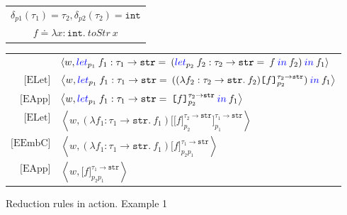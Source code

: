 \documentclass{article}
\newcommand{\emb}[3]{\texttt{[}#1\texttt{]}_{#2}^{#3}}
\newcommand{\tslam}[3]{\lambda #1 : #2. \: #3}
\newcommand{\plet}[5]{\textcolor[rgb]{0,0,1}{let}_{#1} \: {#2}:{#3} = \: #4 \: \textcolor[rgb]{0,0,1}{in} \: #5}
\newcommand{\eval}[2]{\left\langle {#1},{#2} \right\rangle}
\newcommand\icode[1]{\texttt{#1}}
\newcommand\rulename[1]{\mathrm{\text{[#1]}}}
\begin{document}
\begin{figure}[!htbp]
\begin{center}
\begin{tabular}{c}
$\delta_{p1}(\tau_1) = \tau_2,\delta_{p2}(\tau_2) = \icode{int} $ \\
$f \doteq \tslam{x}{\icode{int}}{toStr \: x}$ 
\end{tabular}
\renewcommand{\arraystretch}{1.2}
\begin{tabular}{r l}
  & $ \eval{w}{\plet{p_1}{f_1}{\tau_1 \rightarrow \texttt{str}}
									{(\plet{p_2}{f_2}{\tau_2 \rightarrow \texttt{str}}
									{f}{f_2})}{f_1}} $ \\
	$\rulename{ELet}$ &$\eval{w}{\plet{p_1}{f_1}{\tau_1 \rightarrow \texttt{str}}
									{((\tslam{f_2}{\tau_2 \rightarrow \texttt{str}}{f_2})
									{\emb{f}{p_2}{\tau_2 \rightarrow \texttt{str}}})}
									{f_1}} $  \\
	$\rulename{EApp}$ &$\eval{w}{\plet{p_1}{f_1}{\tau_1 \rightarrow \texttt{str}}
									{\emb{f}{p_2}{\tau_2 \rightarrow \texttt{str}}}
									{f_1}} $  \\
	$\rulename{ELet}$ &$\eval{w}{(\tslam{f_1}{\tau_1 \rightarrow \texttt{str}}{f_1})
										\emb{\emb{f}{p_2}{\tau_2 \rightarrow \texttt{str}}}{p_1}{\tau_1 \rightarrow \texttt{str}}}
										$  \\
	$\rulename{EEmbC}$ &$\eval{w}{(\tslam{f_1}{\tau_1 \rightarrow \texttt{str}}{f_1})
										\emb{f}{p_2 p_1}{\tau_1 \rightarrow \texttt{str}}}$  \\	
	$\rulename{EApp}$ &$ \eval{w}{\emb{f}{p_2 p_1}{\tau_1 \rightarrow \texttt{str}}} $ \\		
\end{tabular}
\end{center}
\caption{Reduction rules in action. Example 1}%
\label{fig:dynamic_semantic_example}%
\end{figure}
\end{document}
